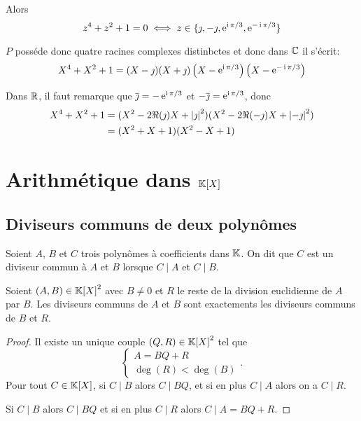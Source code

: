 Alors
\begin{equation}
  z^4+z^2+1 = 0 \iff z \in \{\jmath, -\jmath, \operatorname{e}^{\operatorname{i}\pi/3}, \operatorname{e}^{-\operatorname{i}\pi/3}\}
\end{equation}

\(P\) posséde donc quatre racines complexes distinbctes et donc dans \(\mathbb{C}\) il
s'écrit:
\begin{equation}
  X^4+X^2+1 =
  (X-\jmath)(X+\jmath)\left(X-\operatorname{e}^{\operatorname{i}\pi/3}\right)\left(X-\operatorname{e}^{-\operatorname{i}\pi/3}\right)
\end{equation}

Dans \(\mathbb{R}\), il faut remarque que \(\overline{\jmath} = -\operatorname{e}^{\operatorname{i}\pi/3}\) et
\(-\overline{\jmath} = \operatorname{e}^{\operatorname{i}\pi/3}\), donc
\begin{align}
  X^4+X^2+1 &=
  (X^2-2\Re(\jmath)X+\left\lvert\jmath\right\rvert^2)(X^2-2\Re(-\jmath)X+\left\lvert-\jmath\right\rvert^2)\\
  & = (X^2+X+1)(X^2-X+1)
\end{align}

\section{Arithmétique dans \(\mathbb{K}[X]\)}

\subsection{Diviseurs communs de deux polynômes}

\begin{defdef}
  Soient \(A\), \(B\) et \(C\) trois polynômes à coefficients dans \(\mathbb{K}\). On
  dit que \(C\) est un diviseur commun à \(A\) et \(B\) lorsque \(C\mid{}A\) et
  \(C\mid{}B\).
\end{defdef}

\begin{prop}
  Soient \((A, B) \in {\mathbb{K}[X]}^2\) avec \(B \neq 0\) et \(R\) le reste de la division
  euclidienne de \(A\) par \(B\). Les diviseurs communs de \(A\) et \(B\) sont
  exactements les diviseurs communs de \(B\) et \(R\).
\end{prop}
\begin{proof}
  Il existe un unique couple \((Q, R) \in {\mathbb{K}[X]}^2\) tel que \begin{equation}
    \begin{cases} A = BQ+R \\ \deg(R) < \deg(B) \end{cases}.
  \end{equation}
  Pour tout \(C \in \mathbb{K}[X]\), si  \(C\mid{}B\) alors \(C\mid{}BQ\), et si en plus
  \(C\mid{}A\) alors on a \(C\mid{}R\).

  Si \(C\mid{}B\) alors \(C\mid{}BQ\) et si en plus \(C\mid{}R\) alors
  \(C\mid{}A = BQ+R\).
\end{proof}

